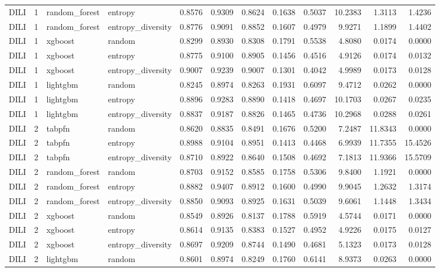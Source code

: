 \begin{tabular}{lrllrrrrrrrr}
DILI & 1 & random_forest & entropy & 0.8576 & 0.9309 & 0.8624 & 0.1638 & 0.5037 & 10.2383 & 1.3113 & 1.4236 \\
DILI & 1 & random_forest & entropy_diversity & 0.8776 & 0.9091 & 0.8852 & 0.1607 & 0.4979 & 9.9271 & 1.1899 & 1.4402 \\
DILI & 1 & xgboost & random & 0.8299 & 0.8930 & 0.8308 & 0.1791 & 0.5538 & 4.8080 & 0.0174 & 0.0000 \\
DILI & 1 & xgboost & entropy & 0.8775 & 0.9100 & 0.8905 & 0.1456 & 0.4516 & 4.9126 & 0.0174 & 0.0132 \\
DILI & 1 & xgboost & entropy_diversity & 0.9007 & 0.9239 & 0.9007 & 0.1301 & 0.4042 & 4.9989 & 0.0173 & 0.0128 \\
DILI & 1 & lightgbm & random & 0.8245 & 0.8974 & 0.8263 & 0.1931 & 0.6097 & 9.4712 & 0.0262 & 0.0000 \\
DILI & 1 & lightgbm & entropy & 0.8896 & 0.9283 & 0.8890 & 0.1418 & 0.4697 & 10.1703 & 0.0267 & 0.0235 \\
DILI & 1 & lightgbm & entropy_diversity & 0.8837 & 0.9187 & 0.8826 & 0.1465 & 0.4736 & 10.2968 & 0.0288 & 0.0261 \\
DILI & 2 & tabpfn & random & 0.8620 & 0.8835 & 0.8491 & 0.1676 & 0.5200 & 7.2487 & 11.8343 & 0.0000 \\
DILI & 2 & tabpfn & entropy & 0.8988 & 0.9104 & 0.8951 & 0.1413 & 0.4468 & 6.9939 & 11.7355 & 15.4526 \\
DILI & 2 & tabpfn & entropy_diversity & 0.8710 & 0.8922 & 0.8640 & 0.1508 & 0.4692 & 7.1813 & 11.9366 & 15.5709 \\
DILI & 2 & random_forest & random & 0.8703 & 0.9152 & 0.8585 & 0.1758 & 0.5306 & 9.8400 & 1.1921 & 0.0000 \\
DILI & 2 & random_forest & entropy & 0.8882 & 0.9407 & 0.8912 & 0.1600 & 0.4990 & 9.9045 & 1.2632 & 1.3174 \\
DILI & 2 & random_forest & entropy_diversity & 0.8850 & 0.9093 & 0.8925 & 0.1631 & 0.5039 & 9.6061 & 1.1448 & 1.3434 \\
DILI & 2 & xgboost & random & 0.8549 & 0.8926 & 0.8137 & 0.1788 & 0.5919 & 4.5744 & 0.0171 & 0.0000 \\
DILI & 2 & xgboost & entropy & 0.8614 & 0.9135 & 0.8383 & 0.1527 & 0.4952 & 4.9226 & 0.0175 & 0.0127 \\
DILI & 2 & xgboost & entropy_diversity & 0.8697 & 0.9209 & 0.8744 & 0.1490 & 0.4681 & 5.1323 & 0.0173 & 0.0128 \\
DILI & 2 & lightgbm & random & 0.8601 & 0.8974 & 0.8249 & 0.1760 & 0.6141 & 8.9373 & 0.0263 & 0.0000 \\

\end{tabular}

